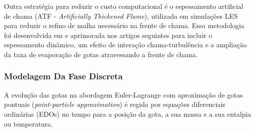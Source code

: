 Outra estratégia para reduzir o custo computacional é o espessamento artificial de chama (ATF - \emph{Artificially Thickened Flame}), utilizada em simulações LES para reduzir o refino de malha necessário na frente de chama.
Essa metodologia foi desenvolvida em \cite{SacomanoF2017PhD} e aprimorada nos artigos seguintes \cite{SacomanoF2017CF, SacomanoF2020CF} para incluir o espessamento dinâmico, um efeito de interação chama-turbulência e a ampliação da taxa de evaporação de gotas atravessando a frente de chama.


\subsubsection{Modelagem Da Fase Discreta} \label{sec:gotas}

A evolução das gotas na abordagem Euler-Lagrange com aproximação de gotas pontuais (\emph{point-particle approximation}) é regida por equações diferenciais ordinárias (EDOs) no tempo para a posição da gota, a sua massa e a sua entalpia ou temperatura.


